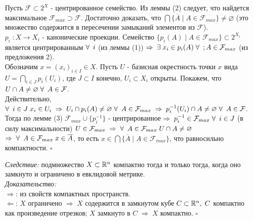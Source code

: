 \documentclass[../../main.tex]{subfiles}
\begin{document}
Пусть $\mathcal F\subset 2^X$ - центрированное семейство. Из леммы (2) следует, что найдется максимальное $\mathcal F_{max}\supset\mathcal F$. Достаточно доказать, что $\bigcap \{\overline A\; | \; A \in \mathcal F_{max}\}\neq\varnothing$ (это множество содержится в пересечении замыканий элементов  из $\mathcal F$).\\
$p_i\;:X\rightarrow X_i$ - канонические проекции. Семейство $\{p_i(A)\;|\; A \in \mathcal F_{max}\}\subset2^{X_i}$ является центрированным $\forall\:\;i$ (из леммы (1)) $\Rightarrow\;\exists\; x_i\in p_i(A)\; \forall\: \;; A \in \mathcal F_{max}$ (из предложения 2).\\
Обозначим $x = (x_i)_{i\in I}\in X$. Пусть $U$ - базисная окрестность точки $x$ вида $U = \bigcap\limits_{i\in J} p_i(U_i)$, где $J\subset I$ конечно, $U_i \subset X_i$ открыты. Покажем, что $U\cap A \neq \varnothing\; \forall\:\; A\in \mathcal F$.\\
Действительно, $\forall\:\; i\in J\; x_i\in U_i\;\Rightarrow\; U_i\cap p_i(A)\neq \varnothing\;\forall\:\; A\in \mathcal F_{max}\; \Rightarrow\; p_i^{-1}(U_i)\cap A\neq \varnothing\; \forall\:\; A\in \mathcal F$. Тогда по лемме (3) $\mathcal F_{max}\cup\{p_i^{-1}\}$ - центрированное $\Rightarrow\; p_i^{-1} \in \mathcal F_{max}\;\forall\:\; i\in J$ (в силу максимальности) $U\in\mathcal F_{max}\;\Rightarrow\;\forall\:\; A\in \mathcal F_{max}\; U\cap A\neq\varnothing$ $\Rightarrow\; \forall\:\;A\in \mathcal F_{max}\; x\in \overline A$, то есть $x\in \bigcap \{\overline A\; | \; A\in\mathcal F_{max}\}$, что равносильно компактности. $\square$

\textit{Следствие:} подмножество $X\subset\mathbb{R}^n$ компактно тогда и только тогда, когда оно замкнуто и ограничено в евклидовой метрике.\\
\textit{Доказательство:}\\
$\Rightarrow$: из свойств компактных пространств.\\
$\Leftarrow$: $X$ ограничено $\Rightarrow\; X$ содержится в замкнутом кубе $C\subset\mathbb{R}^n,\;C$ компактно как произведение отрезков; $X$ замкнуто в $C\;\Rightarrow\;X$ компактно. $\square$
\end{document}
